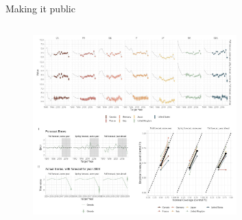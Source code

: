 \documentclass[en]{sdqbeamer}
\begin{document}
\begin{frame}{Making it public}
\begin{columns}
\begin{column}{0.6\textwidth}
\begin{figure}
        \includegraphics[width=0.7\textwidth]{figures/shinycap.jpg}
        \label{fig:enter-label}
    \end{figure}   
\end{column}
\end{columns}

\end{frame}



\end{document}
